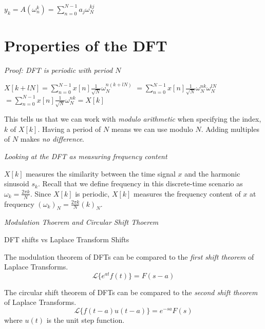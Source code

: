 $y_k = A(\omega^{k}_n) = \sum^{N-1}_{n=0} a_j \omega^{kj}_N$


\section{Properties of the DFT}


\frmrule 

\textit{Proof: DFT is periodic with period $N$}

$X[k + lN] = \sum^{N-1}_{n=0} x[n] \frac{1}{\sqrt{N}}\omega^{n(k+lN)}_N$
$= \sum^{N-1}_{n=0} x[n] \frac{1}{\sqrt{N}}\omega^{nk}_N\omega^{lN}_N$
$= \sum^{N-1}_{n=0} x[n] \frac{1}{\sqrt{N}}\omega^{nk}_N = X[k]$

\frmrule 

This tells us that we can work with \textit{modulo arithmetic} when specifying 
the index, $k$ of $X[k]$. Having a period of $N$ means we can use modulo $N$.
Adding multiples of $N$ makes \textit{no difference}. 

\frmrule 


\textit{Looking at the DFT as measuring frequency content }


$X[k]$ measures the similarity between the time signal $x$ and the harmonic 
sinusoid $s_k$. Recall that we define frequency in this discrete-time 
scenario as $\omega_k = \frac{2\pi k}{N}$.
Since $X[k]$ is periodic, $X[k]$ measures the frequency content of 
$x$ at frequency $(\omega_k)_N = \frac{2\pi k}{N} (k)_N$. 



\frmrule 


\frmrule 

\textit{Modulation Thoerem and Circular Shift Thoerem}



\begin{sidenote}{DFT shifts vs Laplace Transform Shifts}

The modulation theorem of DFTs can be compared to the \textit{first shift
theorem} of Laplace Transforms.
$$\mathcal{L}\{e^{at}f(t)\} = F(s-a)$$

The circular shift theorem of DFTs can be compared 
to the \textit{second shift theorem} of Laplace Transforms. 
$$\mathcal{L}\{f(t-a)u(t-a)\} = e^{-sa}F(s)$$
where $u(t)$ is the unit step function.
\end{sidenote}
